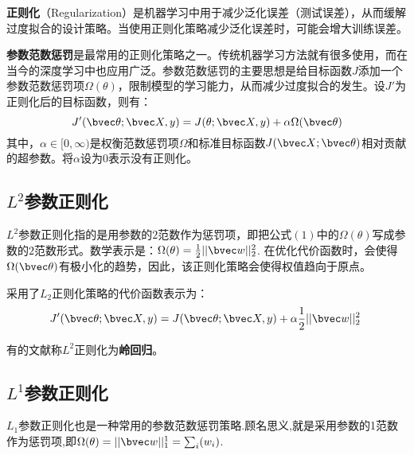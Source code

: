 
\textbf{正则化}（Regularization）是机器学习中用于减少泛化误差（测试误差），从而缓解过度拟合的设计策略。当使用正则化策略减少泛化误差时，可能会增大训练误差。

\textbf{参数范数惩罚}是最常用的正则化策略之一。传统机器学习方法就有很多使用，而在当今的深度学习中也应用广泛。参数范数惩罚的主要思想是给目标函数$J$添加一个参数范数惩罚项$\Omega(\theta)$，限制模型的学习能力，从而减少过度拟合的发生。设$J'$为正则化后的目标函数，则有：
\begin{equation}
J'(\bvec \theta;\bvec X,y)=J(\theta;\bvec X,y)+\alpha\Omega(\bvec \theta)
\end{equation}
其中，$\alpha\in[0,\infty)$是权衡范数惩罚项$\Omega$和标准目标函数$J(\bvec X;\bvec \theta)$相对贡献的超参数。将$\alpha$设为$0$表示没有正则化。

\subsection{$L^2$参数正则化}

$L^2$参数正则化指的是用参数的$2$范数作为惩罚项，即把公式$(1)$中的$\Omega(\theta)$写成参数的$2$范数形式。数学表示是：$\Omega(\theta)=\frac{1}{2}||\bvec w||_2^2$.
在优化代价函数时，会使得$\Omega(\bvec \theta)$有极小化的趋势，因此，该正则化策略会使得权值趋向于原点。

采用了$L_2$正则化策略的代价函数表示为：
\begin{equation}
J'(\bvec \theta;\bvec X,y)=J(\bvec \theta;\bvec X,y)+\alpha\frac{1}{2}||\bvec w||_2^2~
\end{equation}

有的文献称$L^2$正则化为\textbf{岭回归}。


\subsection{$L^1$参数正则化}

$L_1$参数正则化也是一种常用的参数范数惩罚策略.顾名思义,就是采用参数的1范数作为惩罚项,即$\Omega(\theta)=||\bvec w||_1^1=\sum_i(w_i)$.